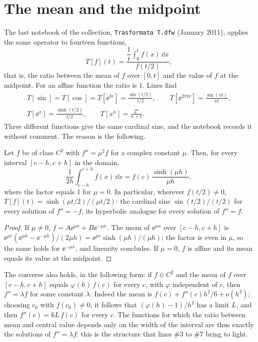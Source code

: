 \section{The mean and the midpoint}
\label{sec:media}

The last notebook of the collection, \texttt{Trasformata T.dfw} (January
2011), applies the same operator to fourteen functions,
\[
  T[f](t)=\frac{\dfrac1t\displaystyle\int_0^t f(x)\,\dd x}{f(t/2)},
\]
that is, the ratio between the mean of $f$ over $[0,t]$ and the value of $f$
at the midpoint. For an affine function the ratio is $1$. Lines
 find
\begin{gather*}
  T[\sin]=T[\cos]=T[\ee^{\ii x}]=\frac{\sin(t/2)}{t/2},\qquad
  T[\ee^{2\pi\ii x}]=\frac{\sin(\pi t)}{\pi t},\\
  T[\ee^{x}]=\frac{\sinh(t/2)}{t/2},\qquad
  T[x^n]=\frac{2^n}{n+1}.
\end{gather*}
Three different functions give the same cardinal sine, and the notebook
records it without comment. The reason is the following.

\begin{prop}\label{prop:media}
Let $f$ be of class $C^2$ with $f''=\mu^2 f$ for a complex constant $\mu$.
Then, for every interval $[c-h,c+h]$ in the domain,
\[
  \frac1{2h}\int_{c-h}^{c+h}f(x)\,\dd x=f(c)\,\frac{\sinh(\mu h)}{\mu h},
\]
where the factor equals $1$ for $\mu=0$. In particular, wherever
$f(t/2)\neq0$, $T[f](t)=\sinh(\mu t/2)/(\mu t/2)$: the cardinal sine
$\sin(t/2)/(t/2)$ for every solution of $f''=-f$, its hyperbolic analogue for
every solution of $f''=f$.
\end{prop}

\begin{proof}
If $\mu\neq0$, $f=A\ee^{\mu x}+B\ee^{-\mu x}$. The mean of $\ee^{\mu x}$ over
$[c-h,c+h]$ is $\ee^{\mu c}(\ee^{\mu h}-\ee^{-\mu h})/(2\mu h)
=\ee^{\mu c}\sinh(\mu h)/(\mu h)$; the factor is even in $\mu$, so the same
holds for $\ee^{-\mu x}$, and linearity concludes. If $\mu=0$, $f$ is affine
and its mean equals its value at the midpoint.
\end{proof}

\begin{oss}
The converse also holds, in the following form: if $f\in C^2$ and the mean of
$f$ over $[c-h,c+h]$ equals $\varphi(h)\,f(c)$ for every $c$, with $\varphi$
independent of $c$, then $f''=\lambda f$ for some constant $\lambda$. Indeed
the mean is $f(c)+f''(c)h^2/6+o(h^2)$; choosing $c_0$ with $f(c_0)\neq0$, it
follows that $(\varphi(h)-1)/h^2$ has a limit $L$, and then $f''(c)=6L\,f(c)$
for every $c$. The functions for which the ratio between mean and central
value depends only on the width of the interval are thus exactly the
solutions of $f''=\lambda f$: this is the structure that lines \#3 to \#7
bring to light.
\end{oss}

